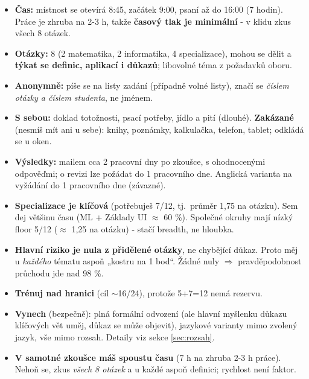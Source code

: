 \documentclass[11pt,a4paper]{article}
\begin{document}
\begin{infobox}[title={Logistika zkoušky (dle pokynů k termínu)}]
\begin{itemize}[leftmargin=1.2em]
  \item \textbf{Čas:} místnost se otevírá 8:45, začátek 9:00, psaní až do 16:00 (7 hodin).
  Práce je zhruba na 2-3 h, takže \textbf{časový tlak je minimální} - v klidu zkus všech 8 otázek.
  \item \textbf{Otázky:} 8 (2 matematika, 2 informatika, 4 specializace), mohou se dělit a
  \textbf{týkat se definic, aplikací i důkazů}; libovolné téma z požadavků oboru.
  \item \textbf{Anonymně:} píše se na listy zadání (případně volné listy), značí se
  \emph{číslem otázky a číslem studenta}, ne jménem.
  \item \textbf{S sebou:} doklad totožnosti, psací potřeby, jídlo a pití (dlouhé). \textbf{Zakázané}
  (nesmíš mít ani u sebe): knihy, poznámky, kalkulačka, telefon, tablet; odkládá se u oken.
  \item \textbf{Výsledky:} mailem cca 2 pracovní dny po zkoušce, s ohodnocenými odpověďmi; o revizi
  lze požádat do 1 pracovního dne. Anglická varianta na vyžádání do 1 pracovního dne (závazné).
\end{itemize}
\end{infobox}

\begin{itemize}[leftmargin=1.3em]
  \item \textbf{Specializace je klíčová} (potřebuješ 7/12, tj.\ průměr 1,75 na otázku). Sem dej
  většinu času (ML + Základy UI $\approx$ 60 \%). Společné okruhy mají nízký floor 5/12
  ($\approx$ 1,25 na otázku) - stačí breadth, ne hloubka.
  \item \textbf{Hlavní riziko je nula z přidělené otázky}, ne chybějící důkaz. Proto měj u
  \emph{každého} tématu aspoň „kostru na 1 bod“. Žádné nuly $\Rightarrow$ pravděpodobnost
  průchodu jde nad 98 \%.
  \item \textbf{Trénuj nad hranici} (cíl $\sim$16/24), protože 5+7=12 nemá rezervu.
  \item \textbf{Vynech} (bezpečně): plná formální odvození (ale hlavní myšlenku důkazu klíčových
  vět uměj, důkaz se může objevit), jazykové varianty mimo zvolený jazyk, vše mimo rozsah.
  Detaily viz sekce \ref{sec:rozsah}.
  \item \textbf{V samotné zkoušce máš spoustu času} (7 h na zhruba 2-3 h práce). Nehoň se, zkus
  \emph{všech 8 otázek} a u každé aspoň definici; rychlost není faktor.
\end{itemize}
\end{document}
